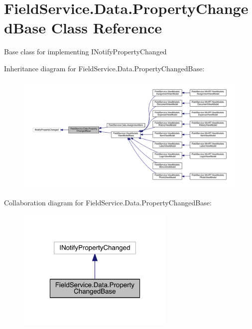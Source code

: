 \hypertarget{class_field_service_1_1_data_1_1_property_changed_base}{\section{Field\+Service.\+Data.\+Property\+Changed\+Base Class Reference}
\label{class_field_service_1_1_data_1_1_property_changed_base}
}


Base class for implementing I\+Notify\+Property\+Changed  




Inheritance diagram for Field\+Service.\+Data.\+Property\+Changed\+Base\+:
\nopagebreak
\begin{figure}[H]
\begin{center}
\leavevmode
\includegraphics[width=350pt]{class_field_service_1_1_data_1_1_property_changed_base__inherit__graph}
\end{center}
\end{figure}


Collaboration diagram for Field\+Service.\+Data.\+Property\+Changed\+Base\+:
\nopagebreak
\begin{figure}[H]
\begin{center}
\leavevmode
\includegraphics[width=214pt]{class_field_service_1_1_data_1_1_property_changed_base__coll__graph}
\end{center}
\end{figure}
